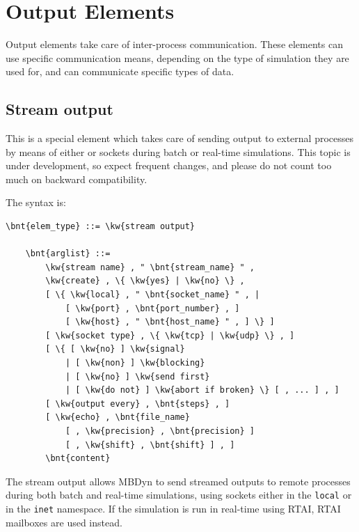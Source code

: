 \section{Output Elements}
Output elements take care of inter-process communication.
These elements can use specific communication means,
depending on the type of simulation they are used for,
and can communicate specific types of data.

\subsection{Stream output}\label{sec:EL:OUTELEM:STREAM_OUTPUT}
This is a special element which takes care of sending output
to external processes by means of either  or  sockets
during batch or real-time simulations.
This topic is under development, so expect frequent changes, and
please do not count too much on backward compatibility.

The syntax is:
\begin{Verbatim}[commandchars=\\\{\}]
    \bnt{elem_type} ::= \kw{stream output}

    \bnt{arglist} ::=
        \kw{stream name} , " \bnt{stream_name} " ,
        \kw{create} , \{ \kw{yes} | \kw{no} \} ,
        [ \{ \kw{local} , " \bnt{socket_name} " , |
            [ \kw{port} , \bnt{port_number} , ]
            [ \kw{host} , " \bnt{host_name} " , ] \} ]
        [ \kw{socket type} , \{ \kw{tcp} | \kw{udp} \} , ]
        [ \{ [ \kw{no} ] \kw{signal}
            | [ \kw{non} ] \kw{blocking}
            | [ \kw{no} ] \kw{send first}
            | [ \kw{do not} ] \kw{abort if broken} \} [ , ... ] , ]
        [ \kw{output every} , \bnt{steps} , ]
        [ \kw{echo} , \bnt{file_name}
            [ , \kw{precision} , \bnt{precision} ]
            [ , \kw{shift} , \bnt{shift} ] , ]
        \bnt{content}
\end{Verbatim}
The stream output allows MBDyn to send streamed outputs 
to remote processes during both batch and real-time simulations,
using sockets either in the \texttt{local} or in the \texttt{inet} namespace.
If the simulation is run in real-time using RTAI, RTAI mailboxes
are used instead.


